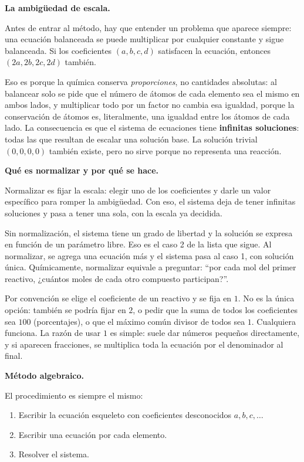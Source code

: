 \medskip
\textbf{La ambigüedad de escala.}

Antes de entrar al método, hay que entender un problema que
aparece siempre: una ecuación balanceada se puede multiplicar por
cualquier constante y sigue balanceada. Si los coeficientes
$(a, b, c, d)$ satisfacen la ecuación, entonces
$(2a, 2b, 2c, 2d)$ también.

Eso es porque la química conserva \emph{proporciones}, no
cantidades absolutas: al balancear solo se pide que el número de
átomos de cada elemento sea el mismo en ambos lados, y multiplicar
todo por un factor no cambia esa igualdad, porque la conservación
de átomos es, literalmente, una igualdad entre los átomos de cada
lado. La consecuencia es que el sistema de ecuaciones tiene
\textbf{infinitas soluciones}: todas las que resultan de escalar
una solución base. La solución trivial $(0,0,0,0)$ también
existe, pero no sirve porque no representa una reacción.

\medskip
\textbf{Qué es normalizar y por qué se hace.}

Normalizar es fijar la escala: elegir uno de los coeficientes y
darle un valor específico para romper la ambigüedad. Con eso, el
sistema deja de tener infinitas soluciones y pasa a tener una
sola, con la escala ya decidida.

Sin normalización, el sistema tiene un grado de libertad y la
solución se expresa en función de un parámetro libre. Eso es el
caso 2 de la lista que sigue. Al normalizar, se agrega una
ecuación más y el sistema pasa al caso 1, con solución única.
Químicamente, normalizar equivale a preguntar: ``por cada mol del
primer reactivo, ¿cuántos moles de cada otro compuesto
participan?''.

Por convención se elige el coeficiente de un reactivo y se fija en
$1$. No es la única opción: también se podría fijar en $2$, o
pedir que la suma de todos los coeficientes sea $100$
(porcentajes), o que el máximo común divisor de todos sea $1$.
Cualquiera funciona. La razón de usar $1$ es simple: suele dar
números pequeños directamente, y si aparecen fracciones, se
multiplica toda la ecuación por el denominador al final.

\medskip
\textbf{Método algebraico.}

El procedimiento es siempre el mismo:
\begin{enumerate}
    \item Escribir la ecuación esqueleto con coeficientes
    desconocidos $a, b, c, \ldots$
    \item Escribir una ecuación por cada elemento.
    \item Resolver el sistema.
\end{enumerate}

